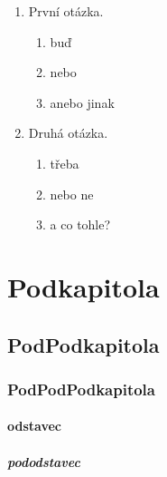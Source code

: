 \documentclass[FM,DP]{tulthesis}
\begin{document}
\begin{enumerate}

\item První otázka.
\begin{enumerate}
\item buď
\item nebo
\item anebo jinak
\end{enumerate}

\item Druhá otázka.
\begin{enumerate}
\item třeba
\item nebo ne
\item a co tohle?
\end{enumerate}

\end{enumerate}


\section{Podkapitola}

\subsection{PodPodkapitola}

\subsubsection{PodPodPodkapitola}

\paragraph{odstavec}

\subparagraph{pododstavec}
\end{document}
